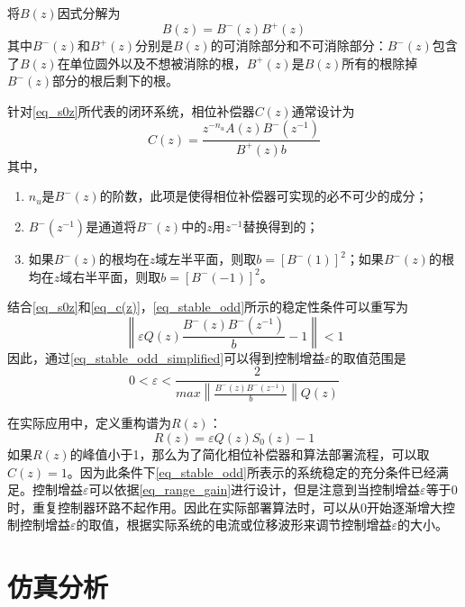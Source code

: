 \documentclass[
  lang=cn,
  degree=master,
  openany,oneside
]{nuaathesis}
\begin{document}
将$B(z)$因式分解为
\begin{equation}
B(z)=B^-(z)B^+(z)
\end{equation}
其中$B^-(z)$和$B^+(z)$分别是$B(z)$的可消除部分和不可消除部分：$B^-(z)$包含了$B(z)$在单位圆外以及不想被消除的根，$B^+(z)$是$B(z)$所有的根除掉$B^-(z)$部分的根后剩下的根。

针对\autoref{eq_s0z}所代表的闭环系统，相位补偿器$C(z)$通常设计为
\begin{equation}
\label{eq_c(z)}
C(z)=\frac{z^{-n_u}A(z)B^-(z^{-1})}{B^+(z)b}
\end{equation}
其中，
\begin{enumerate}
	\item $n_u$是$B^-(z)$的阶数，此项是使得相位补偿器可实现的必不可少的成分；
	\item $B^-(z^{-1})$是通道将$B^-(z)$中的$z$用$z^{-1}$替换得到的；
	\item 如果$B^-(z)$的根均在$z$域左半平面，则取$b={\left[ B^-(1)\right]}^2$；如果$B^-(z)$的根均在$z$域右半平面，则取$b={\left[ B^-(-1)\right]}^2$。
\end{enumerate}
结合\autoref{eq_s0z}和\autoref{eq_c(z)}，\autoref{eq_stable_odd}所示的稳定性条件可以重写为
\begin{equation}
	\label{eq_stable_odd_simplified}
	\left\|\varepsilon Q(z)\frac{B^-(z)B^-(z^{-1})}{b}-1\right\|<1
\end{equation}
因此，通过\autoref{eq_stable_odd_simplified}可以得到控制增益$\varepsilon$的取值范围是
\begin{equation}
	\label{eq_range_gain}
	0 < \varepsilon < \frac{2}{max\left \| \frac{B^-(z)B^-(z^{-1})}{b}\right \|Q(z)}
\end{equation}

在实际应用中，定义重构谱为$R(z)$：
\begin{equation}
	\label{eq_Rz}
	R(z)=\varepsilon Q(z)S_0(z)	- 1
\end{equation}
如果$R(z)$的峰值小于1，那么为了简化相位补偿器和算法部署流程，可以取$C(z)=1$。因为此条件下\autoref{eq_stable_odd}所表示的系统稳定的充分条件已经满足。控制增益$\varepsilon$可以依据\autoref{eq_range_gain}进行设计，但是注意到当控制增益$\varepsilon$等于$0$时，重复控制器环路不起作用。因此在实际部署算法时，可以从$0$开始逐渐增大控制控制增益$\varepsilon$的取值，根据实际系统的电流或位移波形来调节控制增益$\varepsilon$的大小。
\section{仿真分析}
\end{document}
